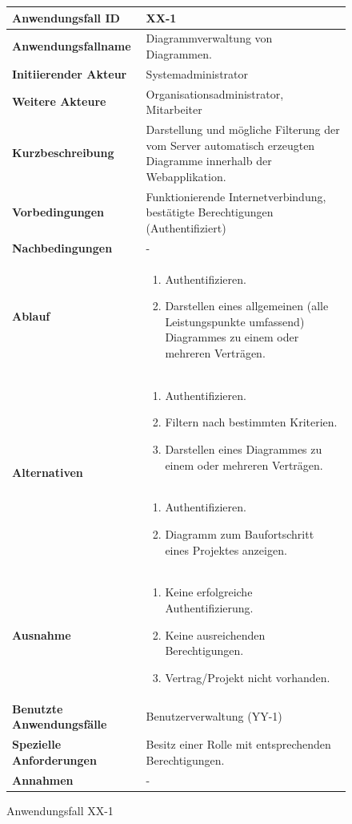 \begin{figure}[h]
	\centering
	\begin{tabularx}{\textwidth}{ X | X }
		\textbf{Anwendungsfall ID} & XX-1 \\ \hline
		\textbf{Anwendungsfallname} & Diagrammverwaltung von Diagrammen. \\ \hline
		\textbf{Initiierender Akteur} & Systemadministrator \\ \hline
		\textbf{Weitere Akteure} & Organisationsadministrator, Mitarbeiter \\ \hline
		\textbf{Kurzbeschreibung} & Darstellung und mögliche Filterung der vom Server automatisch erzeugten Diagramme innerhalb der Webapplikation.  \\ \hline
		\textbf{Vorbedingungen} & Funktionierende Internetverbindung, bestätigte Berechtigungen (Authentifiziert)  \\ \hline
		\textbf{Nachbedingungen} &  -  \\ \hline
		\textbf{Ablauf} &
		\begin{enumerate}
			\item Authentifizieren.
			\item Darstellen eines allgemeinen (alle Leistungspunkte umfassend) Diagrammes zu einem oder mehreren Verträgen.
		\end{enumerate} \\ \hline
		\multirow{2}{*}{\textbf{Alternativen}} &
		\begin{enumerate}
			\item Authentifizieren.
			\item Filtern nach bestimmten Kriterien.
			\item Darstellen eines Diagrammes zu einem oder mehreren Verträgen.
		\end{enumerate} \\\cline{2-2} &
		\begin{enumerate}
			\item Authentifizieren.
			\item Diagramm zum Baufortschritt eines Projektes anzeigen.
		\end{enumerate}  \\ \hline
		\textbf{Ausnahme} &
		\begin{enumerate}
			\item Keine erfolgreiche Authentifizierung.
			\item Keine ausreichenden Berechtigungen.
			\item Vertrag/Projekt nicht vorhanden.
		\end{enumerate}  \\ \hline
		\textbf{Benutzte Anwendungsfälle} & Benutzerverwaltung (YY-1) \\ \hline
		\textbf{Spezielle Anforderungen} & Besitz einer Rolle mit entsprechenden Berechtigungen. \\ \hline
		\textbf{Annahmen} & -
	\end{tabularx}
	\caption{Anwendungsfall XX-1}
	\label{fig:anwendungsfall-diagrammverwaltung-tabelle-xx-1}
\end{figure}
